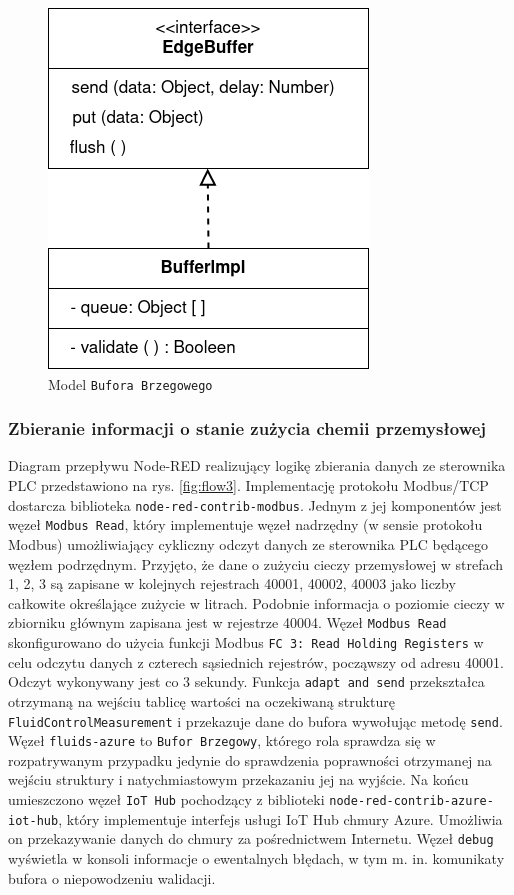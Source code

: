 \documentclass[a4paper, 12pt, twoside]{article}
\begin{document}
\begin{figure}
      \centering
      \includegraphics[scale=0.4]{edge_buffer.png}
      \caption{Model \texttt{Bufora Brzegowego}}
      \label{fig:edge-buffer}
\end{figure}

\subsubsection{Zbieranie informacji o stanie zużycia chemii przemysłowej }

Diagram przepływu Node-RED realizujący logikę zbierania danych ze sterownika
PLC przedstawiono na rys. \ref{fig:flow3}. Implementację protokołu
Modbus/TCP dostarcza biblioteka \texttt{node-red-contrib-modbus}.
Jednym z jej komponentów jest węzeł \texttt{Modbus Read}, który implementuje
węzeł nadrzędny (w sensie protokołu Modbus) umożliwiający cykliczny odczyt
danych ze sterownika PLC będącego węzłem podrzędnym. Przyjęto, że dane
o zużyciu cieczy przemysłowej w strefach 1, 2, 3 są zapisane w kolejnych rejestrach
40001, 40002, 40003 jako liczby całkowite określające zużycie w litrach.
Podobnie informacja o poziomie cieczy w zbiorniku głównym zapisana jest w rejestrze 40004.
Węzeł \texttt{Modbus Read} skonfigurowano do użycia funkcji Modbus
\texttt{FC 3: Read Holding Registers} w celu odczytu danych z czterech sąsiednich
rejestrów, począwszy od adresu 40001. Odczyt wykonywany jest co 3 sekundy.
Funkcja \texttt{adapt and send} przekształca otrzymaną na wejściu tablicę
wartości na oczekiwaną strukturę \texttt{FluidControlMeasurement}
i przekazuje dane do bufora wywołując metodę \texttt{send}.
Węzeł \texttt{fluids-azure} to \texttt{Bufor Brzegowy}, którego rola sprawdza się
w rozpatrywanym przypadku jedynie do sprawdzenia poprawności otrzymanej na
wejściu struktury i natychmiastowym przekazaniu jej na wyjście. Na końcu
umieszczono węzeł \texttt{IoT Hub} pochodzący z biblioteki \texttt{node-red-contrib-azure-iot-hub},
który implementuje interfejs usługi IoT Hub chmury Azure. Umożliwia on przekazywanie
danych do chmury za pośrednictwem Internetu.
Węzeł \texttt{debug} wyświetla w konsoli informacje o ewentalnych błędach, w
tym m. in. komunikaty bufora o niepowodzeniu walidacji.
\end{document}
